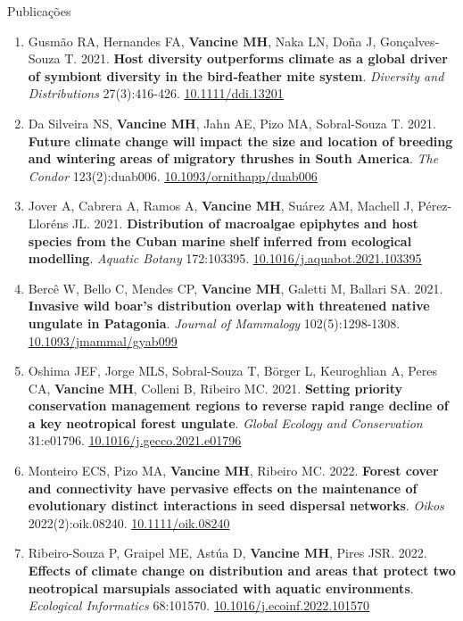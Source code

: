 \documentclass{resume}
\begin{document}
\begin{rSection}{Publicações}
\begin{enumerate}
\item Gusmão RA, Hernandes FA, {\bf Vancine MH}, Naka LN, Doña J, Gonçalves‐Souza T. 2021. {\bf Host diversity outperforms climate as a global driver of symbiont diversity in the bird‐feather mite system}. {\it Diversity and Distributions} 27(3):416-426. \href{https://doi.org/10.1111/ddi.13201}{\underline{10.1111/ddi.13201}}

\item Da Silveira NS, {\bf Vancine MH}, Jahn AE, Pizo MA, Sobral-Souza T. 2021. {\bf Future climate change will impact the size and location of breeding and wintering areas of migratory thrushes in South America}. {\it The Condor} 123(2):duab006. \href{https://doi.org/10.1093/ornithapp/duab006}{\underline{10.1093/ornithapp/duab006}}

\item Jover A, Cabrera A, Ramos A, {\bf Vancine MH}, Suárez AM, Machell J, Pérez-Lloréns JL. 2021. {\bf Distribution of macroalgae epiphytes and host species from the Cuban marine shelf inferred from ecological modelling}. {\it Aquatic Botany} 172:103395. \href{https://doi.org/10.1016/j.aquabot.2021.103395}{\underline{10.1016/j.aquabot.2021.103395}}

\item Bercê W, Bello C, Mendes CP, {\bf Vancine MH}, Galetti M, Ballari SA. 2021. {\bf Invasive wild boar’s distribution overlap with threatened native ungulate in Patagonia}. {\it Journal of Mammalogy} 102(5):1298-1308. \href{https://doi.org/10.1093/jmammal/gyab099}{\underline{10.1093/jmammal/gyab099}}

\item Oshima JEF, Jorge MLS, Sobral-Souza T, Börger L, Keuroghlian A, Peres CA, {\bf Vancine MH}, Colleni B, Ribeiro MC. 2021. {\bf Setting priority conservation management regions to reverse rapid range decline of a key neotropical forest ungulate}. {\it Global Ecology and Conservation} 31:e01796. \href{https://doi.org/10.1016/j.gecco.2021.e01796}{\underline{10.1016/j.gecco.2021.e01796}}

\item Monteiro ECS, Pizo MA, {\bf Vancine MH}, Ribeiro MC. 2022. {\bf Forest cover and connectivity have pervasive effects on the maintenance of evolutionary distinct interactions in seed dispersal networks}. {\it Oikos} 2022(2):oik.08240. \href{https://doi.org/10.1111/oik.08240}{\underline{10.1111/oik.08240}}

\item Ribeiro-Souza P, Graipel ME, Astúa D, {\bf Vancine MH}, Pires JSR. 2022. {\bf Effects of climate change on distribution and areas that protect two neotropical marsupials associated with aquatic environments}. {\it Ecological Informatics} 68:101570. \href{https://doi.org/10.1016/j.ecoinf.2022.101570}{\underline{10.1016/j.ecoinf.2022.101570}}


\end{enumerate}
\end{rSection}
\end{document}
